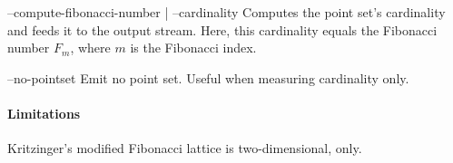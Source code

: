 \begin{procarg}{--compute-fibonacci-number | --cardinality}
  Computes the point set’s cardinality and feeds it to the output stream. Here, this cardinality equals the Fibonacci number $F_m$, where $m$ is the Fibonacci index.
\end{procarg}

\begin{procarg}{--no-pointset}
  Emit no point set. Useful when measuring cardinality only.
\end{procarg}

\procargout

\procargdelimiter

\procargsilent

\paragraph{Limitations}
Kritzinger's modified Fibonacci lattice is two-dimensional, only.
